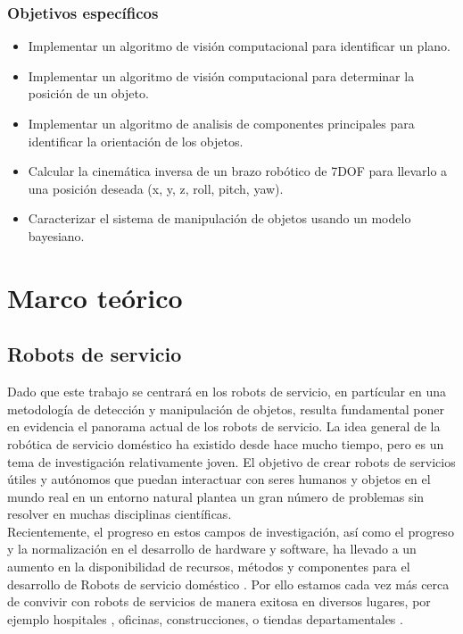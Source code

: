 \documentclass[a4paper, openright, 12pt]{report}
\begin{document}
		\subsection*{Objetivos específicos}
			\begin{itemize}
				\item Implementar un algoritmo de visión computacional para identificar un plano.

				\item Implementar un algoritmo de visión computacional para determinar la posición de un objeto.

				\item Implementar un algoritmo de analisis de componentes principales para identificar la orientación de los objetos.

				\item Calcular la cinemática inversa de un brazo robótico de 7DOF para llevarlo a una posición deseada (x, y, z, roll, pitch, yaw).

				\item Caracterizar el sistema de manipulación de objetos usando un modelo bayesiano.

			\end{itemize}




\chapter{Marco teórico}
	\section{Robots de servicio}


		Dado que este trabajo se centrará en los robots de servicio, en partícular en una metodología de detección y manipulación de objetos, resulta fundamental poner en evidencia el panorama actual de los robots de servicio. La idea general de la robótica de servicio doméstico ha existido desde hace mucho tiempo, pero es un tema de investigación relativamente joven. El objetivo de crear robots de servicios útiles y autónomos que puedan interactuar con seres humanos y objetos en el mundo real en un entorno natural plantea un gran número de problemas sin resolver en muchas disciplinas científicas.\\

		Recientemente, el progreso en estos campos de investigación, así como el progreso y la normalización en el desarrollo de hardware y software, ha llevado a un aumento en la disponibilidad de recursos, métodos y componentes para el desarrollo  de Robots de servicio doméstico . Por ello estamos cada vez más cerca de convivir con robots de servicios de manera exitosa en diversos lugares, por ejemplo hospitales \cite{hospitalRobots}, oficinas, construcciones, o tiendas departamentales \cite{robotsInStores}.\\
\end{document}
